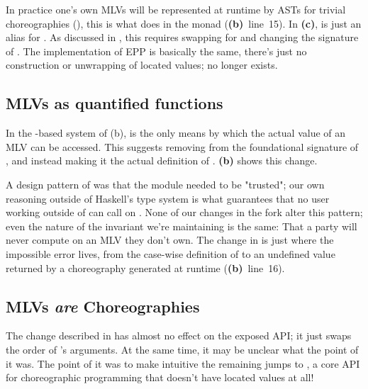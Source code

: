\begin{figure*}[tbhp]
\begin{mdframed}
{	    In practice one's own MLVs will be represented at runtime by ASTs for trivial choreographies (\eg {}),
	    this is what  does in the  monad (\textbf{(b)}~line~15).
	    In \textbf{(c)},  is just an alias for .
	    As discussed in , this requires swapping  for 
	    and changing the signature of .
	    The implementation of EPP is basically the same, there's just no construction or unwrapping of located values;
	     no longer exists.
    }
    \label{fig:minichor-stg2}
  \end{mdframed}
\end{figure*}


\subsection{MLVs as quantified functions}
\label{sec:minichor-stg2}
In the -based system of (b),
 is the only means by which the actual value of an MLV can be accessed.
This suggests removing  from the foundational signature of ,
and instead making it the actual definition of .
\textbf{(b)} shows this change.

A design pattern of \MultiChor was that the  module needed to be "trusted";
our own reasoning outside of Haskell's type system is what guarantees that no user working outside of 
can call  on .
None of our changes in the \minichor fork alter this pattern;
even the nature of the invariant we're maintaining is the same:
That a party will never compute on an MLV they don't own.
The change in  is just where the impossible error lives,
from the case-wise definition of  to an undefined value returned by a choreography generated at runtime
(\textbf{(b)}~line~16).

\subsection{MLVs \emph{are} Choreographies}
\label{sec:minichor-stg3}
The change described in  has almost no effect on the exposed API; it just swaps the order of 's arguments.
At the same time, it may be unclear what the point of it was.
The point of it was to make intuitive the remaining jumps to \minichor, a core API for choreographic programming that
doesn't have located values at all!

